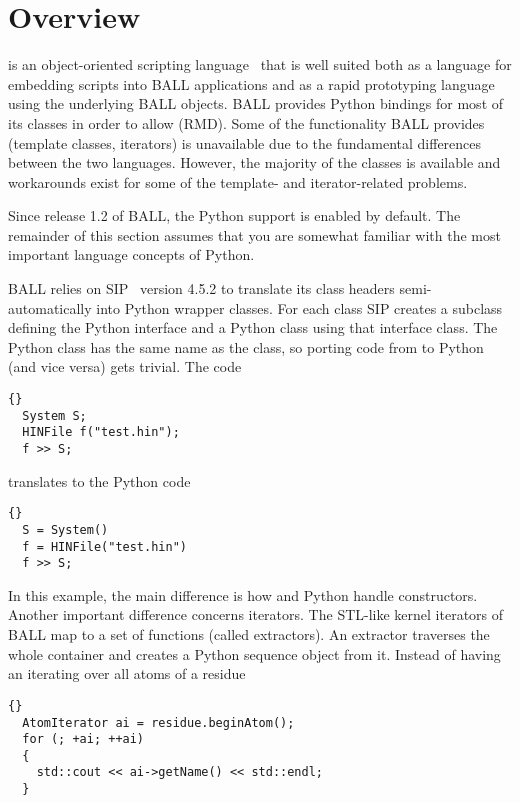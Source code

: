 \section{Overview}

 is an object-oriented scripting language~\cite{Python} that is 
well suited both as a language for embedding scripts into BALL applications and
as a rapid prototyping language using the underlying BALL objects.
BALL provides Python bindings for most of its classes in order to allow 
 (RMD). Some of the functionality BALL 
provides (\eg template classes, iterators) is unavailable due to the 
fundamental differences between the two languages. However, the majority of 
the classes is available and workarounds exist for some of the template- and 
iterator-related problems.

Since release 1.2 of BALL, the Python support is enabled by default. The 
remainder of this section assumes that you are somewhat familiar with the most
important language concepts of Python.

BALL relies on SIP~\cite{SIP}  version 4.5.2 to translate its class
headers semi-automatically into Python wrapper classes. For each \CPP class
SIP creates a subclass defining the Python interface and a Python class
using that \CPP interface class. The Python class has the same name as the
\CPP class, so porting code from \CPP to Python (and vice versa) gets trivial.
The \CPP code 

\begin{lstlisting}{}
  System S;
  HINFile f("test.hin");
  f >> S;
\end{lstlisting}

\noindent
translates to the Python code

\begin{lstlisting}{}
  S = System()
  f = HINFile("test.hin")
  f >> S;
\end{lstlisting}

\noindent
In this example, the main difference is how \CPP and Python handle
constructors. Another important difference concerns iterators. The STL-like
kernel iterators of BALL map to a set of functions (called extractors). An
extractor traverses the whole container and creates a Python sequence object
from it. Instead of having an  iterating over all atoms of
a residue

\begin{lstlisting}{}
  AtomIterator ai = residue.beginAtom();
  for (; +ai; ++ai)
  {
    std::cout << ai->getName() << std::endl;
  }
\end{lstlisting}

